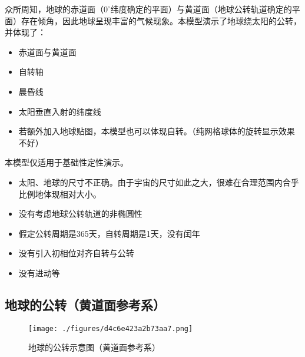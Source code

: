 

众所周知，地球的赤道面（$0 ^\circ$纬度确定的平面）与黄道面（地球公转轨道确定的平面）存在倾角，因此地球呈现丰富的气候现象。本模型演示了地球绕太阳的公转，并体现了：
\begin{itemize}
\item 赤道面与黄道面
\item 自转轴
\item 晨昏线
\item 太阳垂直入射的纬度线
\item 若额外加入地球贴图，本模型也可以体现自转。（纯网格球体的旋转显示效果不好）
\end{itemize}

本模型仅适用于基础性定性演示。
\begin{itemize}
\item 太阳、地球的尺寸不正确。由于宇宙的尺寸如此之大，很难在合理范围内合乎比例地体现相对大小。
\item 没有考虑地球公转轨道的非椭圆性
\item 假定公转周期是365天，自转周期是1天，没有闰年
\item 没有引入初相位对齐自转与公转
\item 没有进动等
\end{itemize}

\subsection{地球的公转（黄道面参考系）}
\begin{figure}[ht]
\centering
\texttt{[image: ./figures/d4c6e423a2b73aa7.png]}
\caption{地球的公转示意图（黄道面参考系）} \label{fig_georev_1}
\end{figure}

